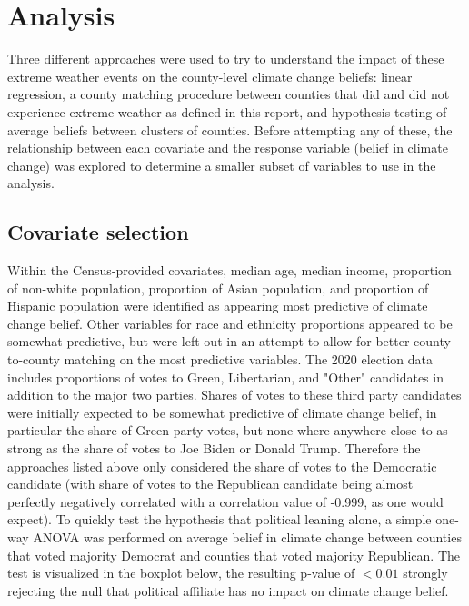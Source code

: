 \documentclass{article}
\begin{document}
\section{Analysis}
Three different approaches were used to try to understand the impact of these extreme weather events on the county-level climate change beliefs: linear regression, a county matching procedure between counties that did and did not experience extreme weather as defined in this report, and hypothesis testing of average beliefs between clusters of counties. Before attempting any of these, the relationship between each covariate and the response variable (belief in climate change) was explored to determine a smaller subset of variables to use in the analysis. 

\subsection{Covariate selection}
Within the Census-provided covariates, median age, median income, proportion of non-white population, proportion of Asian population, and proportion of Hispanic population were identified as appearing most predictive of climate change belief. Other variables for race and ethnicity proportions appeared to be somewhat predictive, but were left out in an attempt to allow for better county-to-county matching on the most predictive variables. The 2020 election data includes proportions of votes to Green, Libertarian, and "Other" candidates in addition to the major two parties. Shares of votes to these third party candidates were initially expected to be somewhat predictive of climate change belief, in particular the share of Green party votes, but none where anywhere close to as strong as the share of votes to Joe Biden or Donald Trump. Therefore the approaches listed above only considered the share of votes to the Democratic candidate (with share of votes to the Republican candidate being almost perfectly negatively correlated with a correlation value of -0.999, as one would expect). To quickly test the hypothesis that political leaning alone, a simple one-way ANOVA was performed on average belief in climate change between counties that voted majority Democrat and counties that voted majority Republican. The test is visualized in the boxplot below, the resulting p-value of $<0.01$ strongly rejecting the null that political affiliate has no impact on climate change belief.
\end{document}
